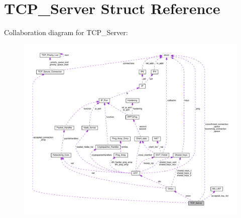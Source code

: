 \hypertarget{struct_t_c_p___server}{\section{T\+C\+P\+\_\+\+Server Struct Reference}
\label{struct_t_c_p___server}
}


Collaboration diagram for T\+C\+P\+\_\+\+Server\+:\nopagebreak
\begin{figure}[H]
\begin{center}
\leavevmode
\includegraphics[width=350pt]{struct_t_c_p___server__coll__graph}
\end{center}
\end{figure}
